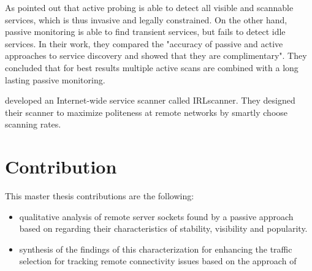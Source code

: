 As \citet{Bartlett07b} pointed out that active probing is able to detect all
visible and scannable services, which is thus invasive and legally constrained.
On the other hand, passive monitoring is able to find transient services, but
fails to detect idle services. In their work, they compared the "accuracy of
passive and active approaches to service discovery and showed that they are
complimentary"\citep{Bartlett07b}. They concluded that for best results multiple
active scans are combined with a long lasting passive monitoring. 

\citet{Leonard:2010} developed an Internet-wide service scanner called
IRLscanner. They designed their scanner to maximize politeness at remote
networks by smartly choose scanning rates. 

\section{Contribution 
\label{sec:contribution}}
This master thesis contributions are the following: 
\begin{itemize}
	\item qualitative analysis of remote server sockets found by a passive approach based on \citet{Schatzmann:Mining,Schatzmann:Dissection, Schatzmann:Tracing} regarding their characteristics of stability, visibility and popularity.
	\item synthesis of the findings of this characterization for enhancing the traffic selection for tracking remote connectivity issues based on the approach of \citet{SchatzmannPAM2011} 
\end{itemize}

